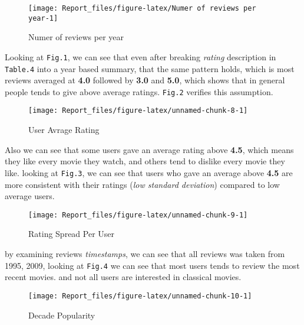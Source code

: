 \documentclass[]{article}
\begin{document}
\begin{figure}

{\centering \texttt{[image: Report\_files/figure-latex/Numer of reviews per year-1]} 

}

\caption{Numer of reviews per year}\label{fig:Numer of reviews per year}
\end{figure}

\newpage

Looking at \texttt{Fig.1}, we can see that even after breaking
\emph{rating} description in \texttt{Table.4} into a year based summary,
that the same pattern holds, which is most reviews averaged at
\textbf{4.0} followed by \textbf{3.0} and \textbf{5.0}, which shows that
in general people tends to give above average ratings. \texttt{Fig.2}
verifies this assumption.

\begin{figure}

{\centering \texttt{[image: Report\_files/figure-latex/unnamed-chunk-8-1]} 

}

\caption{User Avrage Rating}\label{fig:unnamed-chunk-8}
\end{figure}

Also we can see that some users gave an average rating above
\textbf{4.5}, which means they like every movie they watch, and others
tend to dislike every movie they like. looking at \texttt{Fig.3}, we can
see that users who gave an average above \textbf{4.5} are more
consistent with their ratings (\emph{low standard deviation}) compared
to low average users.

\begin{figure}

{\centering \texttt{[image: Report\_files/figure-latex/unnamed-chunk-9-1]} 

}

\caption{Rating Spread Per User}\label{fig:unnamed-chunk-9}
\end{figure}

\newpage

by examining reviews \emph{timestamps}, we can see that all reviews was
taken from 1995, 2009, looking at \texttt{Fig.4} we can see that most
users tends to review the most recent movies. and not all users are
interested in classical movies.

\begin{figure}

{\centering \texttt{[image: Report\_files/figure-latex/unnamed-chunk-10-1]} 

}

\caption{Decade Popularity}\label{fig:unnamed-chunk-10}
\end{figure}
\end{document}

